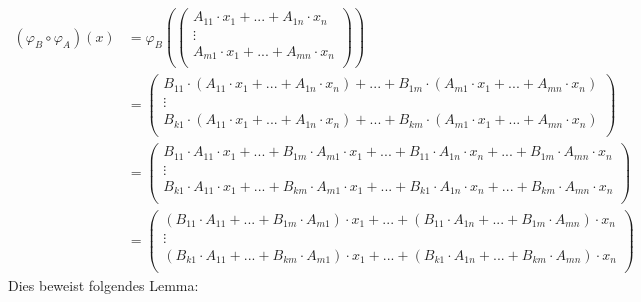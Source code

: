 \documentclass{article}
\begin{document}
\begin{align*}
    (\varphi_B \circ \varphi_A)(x) &= \varphi_B\left(\begin{pmatrix}
        A_{11} \cdot x_1 + ... + A_{1n} \cdot x_n \\
        \vdots \\
        A_{m1} \cdot x_1 + ... + A_{mn} \cdot x_n \\
    \end{pmatrix}\right) \\
    &= \begin{pmatrix}
        B_{11} \cdot (A_{11} \cdot x_1 + ... + A_{1n} \cdot x_n) + ... + B_{1m} \cdot (A_{m1} \cdot x_1 + ... + A_{mn} \cdot x_n) \\
        \vdots \\
        B_{k1} \cdot (A_{11} \cdot x_1 + ... + A_{1n} \cdot x_n) + ... + B_{km} \cdot (A_{m1} \cdot x_1 + ... + A_{mn} \cdot x_n) \\
    \end{pmatrix} \\
    &= \begin{pmatrix}
        B_{11} \cdot A_{11} \cdot x_1 + ... + B_{1m} \cdot A_{m1} \cdot x_1 + ... + B_{11} \cdot A_{1n} \cdot x_n + ... + B_{1m} \cdot A_{mn} \cdot x_n \\
        \vdots \\
        B_{k1} \cdot A_{11} \cdot x_1 + ... + B_{km} \cdot A_{m1} \cdot x_1 + ... + B_{k1} \cdot A_{1n} \cdot x_n + ... + B_{km} \cdot A_{mn} \cdot x_n \\
    \end{pmatrix} \\
    &= \begin{pmatrix}
        (B_{11} \cdot A_{11} + ... + B_{1m} \cdot A_{m1}) \cdot x_1 + ... + (B_{11} \cdot A_{1n} + ... + B_{1m} \cdot A_{mn}) \cdot x_n \\
        \vdots \\
        (B_{k1} \cdot A_{11} + ... + B_{km} \cdot A_{m1}) \cdot x_1 + ... + (B_{k1} \cdot A_{1n} + ... + B_{km} \cdot A_{mn}) \cdot x_n \\
    \end{pmatrix}
    \end{align*}
Dies beweist folgendes Lemma: \\
\end{document}
